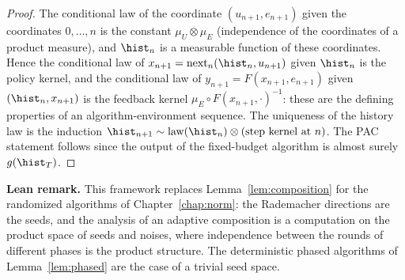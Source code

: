 \begin{proof}
\leanok
{}
The conditional law of the coordinate $(u_{n+1}, e_{n+1})$ given the coordinates
$0, \dots, n$ is the constant $\mu_U \otimes \mu_E$ (independence of the coordinates of a
product measure), and $\hist_n$ is a measurable function of these coordinates. Hence the
conditional law of $x_{n+1} = \mathrm{next}_n(\hist_n, u_{n+1})$ given $\hist_n$ is the
policy kernel, and the conditional law of $y_{n+1} = F(x_{n+1}, e_{n+1})$ given
$(\hist_n, x_{n+1})$ is the feedback kernel $\mu_E \circ F(x_{n+1}, \cdot)^{-1}$: these are the
defining properties of an algorithm-environment sequence. The uniqueness of the history law
is the induction $\hist_{n+1} \sim \mathrm{law}(\hist_n) \otimes (\text{step kernel at } n)$.
The PAC statement follows since the output of the fixed-budget algorithm is almost surely
$g(\hist_T)$.
\end{proof}

\textbf{Lean remark.} This framework replaces Lemma~\ref{lem:composition} for the randomized
algorithms of Chapter~\ref{chap:norm}: the Rademacher directions are the seeds, and the
analysis of an adaptive composition is a computation on the product space of seeds and
noises, where independence between the rounds of different phases is the product structure.
The deterministic phased algorithms of Lemma~\ref{lem:phased} are the case of a trivial seed
space.

